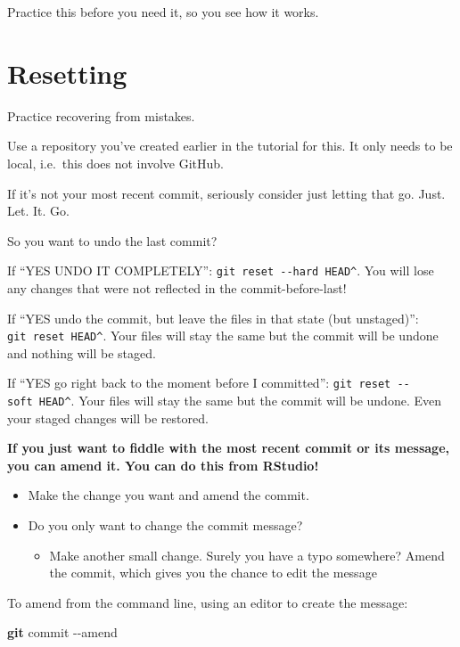 \documentclass[
]{book}
\newenvironment{Shaded}{\begin{snugshade}}{\end{snugshade}}
\newcommand{\AttributeTok}[1]{\textcolor[rgb]{0.13,0.29,0.53}{#1}}
\newcommand{\FunctionTok}[1]{\textcolor[rgb]{0.13,0.29,0.53}{\textbf{#1}}}
\newcommand{\NormalTok}[1]{#1}
\providecommand{\tightlist}{%
  \setlength{\itemsep}{0pt}\setlength{\parskip}{0pt}}
\begin{document}
Practice this before you need it, so you see how it works.

\chapter{Resetting}\label{reset}

Practice recovering from mistakes.

Use a repository you've created earlier in the tutorial for this. It only needs to be local, i.e.~this does not involve GitHub.

If it's not your most recent commit, seriously consider just letting that go. Just. Let. It. Go.

So you want to undo the last commit?

If ``YES UNDO IT COMPLETELY'': \texttt{git\ reset\ -\/-hard\ HEAD\^{}}. You will lose any changes that were not reflected in the commit-before-last!

If ``YES undo the commit, but leave the files in that state (but unstaged)'': \texttt{git\ reset\ HEAD\^{}}. Your files will stay the same but the commit will be undone and nothing will be staged.

If ``YES go right back to the moment before I committed'': \texttt{git\ reset\ -\/-soft\ HEAD\^{}}. Your files will stay the same but the commit will be undone. Even your staged changes will be restored.

\textbf{If you just want to fiddle with the most recent commit or its message, you can amend it. You can do this from RStudio!}

\begin{itemize}
\tightlist
\item
  Make the change you want and amend the commit.
\item
  Do you only want to change the commit message?

  \begin{itemize}
  \tightlist
  \item
    Make another small change. Surely you have a typo somewhere? Amend the commit, which gives you the chance to edit the message
  \end{itemize}
\end{itemize}

To amend from the command line, using an editor to create the message:

\begin{Shaded}
\begin{Highlighting}[]
\FunctionTok{git}\NormalTok{ commit }\AttributeTok{{-}{-}amend}
\end{Highlighting}
\end{Shaded}
\end{document}
